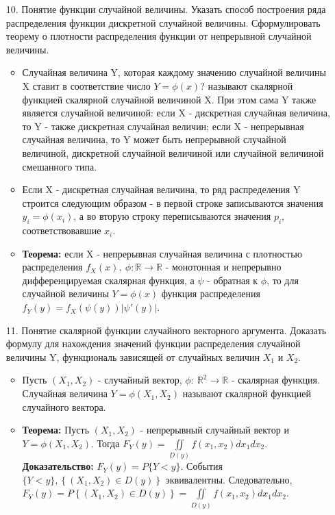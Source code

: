 \documentclass[a4paper]{article}
\begin{document}
\begin{enumerate}
\item[10.] Понятие функции случайной величины. Указать способ построения ряда распределения функции дискретной случайной величины. Сформулировать теорему о плотности распределения функции от непрерывной случайной величины. \\
\begin{itemize}
\item Случайная величина Y, которая каждому значению случайной величины X ставит в соответствие число $Y = \phi(x)$? называют скалярной функцией скалярной случайной величиной X. При этом сама Y также является случайной величиной: если X - дискретная случайная величина, то Y - также дискретная случайная величин; если X - непрерывная случайная величина, то Y может быть непрерывной случайной величиной, дискретной случайной величиной или случайной величиной смешанного типа.
\item Если X - дискретная случайная величина, то ряд распределения Y строится следующим образом - в первой строке записываются значения $y_i = \phi(x_i)$, а во вторую строку переписываются значения $p_i$, соответствовавшие $x_i$.
\item \textbf{Теорема:} если X - непрерывная случайная величина с плотностью распределения $f_X(x), \ \phi: \mathbb{R} \to \mathbb{R}$ - монотонная и непрерывно дифференцируемая скалярная функция, а $\psi$ - обратная к $\phi$, то для случайной величины $Y = \phi(x)$ функция распределения $f_Y(y) = f_X \left( \psi(y) \right) \left|\psi' (y)\right|$.
\end{itemize}


\item[11.] Понятие скалярной функции случайного векторного аргумента. Доказать формулу для нахождения значений функции распределения случайной величины Y, функциональ зависящей  от случайных величин $X_1$ и $X_2$. \\
\begin{itemize}
\item Пусть $(X_1, X_2)$ - случайный вектор, $\phi: \ \mathbb{R}^2 \to \mathbb{R}$ - скалярная функция. Случайная величина $Y = \phi(X_1, X_2)$ называют скалярной функцией случайного вектора.
\item \textbf{Теорема:} Пусть $(X_1, X_2)$ - непрерывный случайный вектор и $Y = \phi (X_1, X_2)$. Тогда $\displaystyle  F_Y(y) = \iint\limits_{D(y)} f(x_1, x_2) dx_1 dx_2$. \\
\textbf{Доказательство:} $F_Y(y) = P\{Y < y\}$. События $\{Y < y\}, \left\{(X_1, X_2) \in D(y) \right\}$ эквивалентны. Следовательно, $\displaystyle  F_Y(y) = P\left\{ (X_1,X_2) \in D(y) \right\} = \iint\limits_{D(y)} f(x_1, x_2) dx_1 dx_2$.
\end{itemize}



\end{enumerate}
\end{document}
